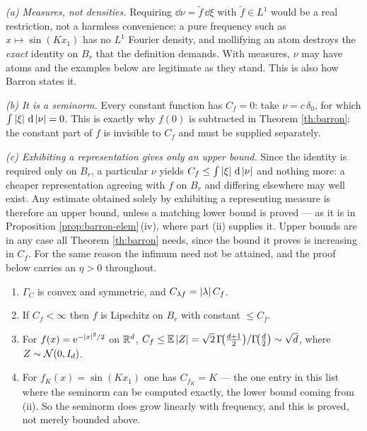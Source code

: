 \documentclass[11pt,a4paper]{article}
\begin{document}
\begin{remark}\label{rem:barron-hygiene}
\emph{(a) Measures, not densities.} Requiring $\dd\nu = \tilde f\,\dd\xi$ with
$\tilde f \in L^1$ would be a real restriction, not a harmless convenience: a pure frequency such
as $x \mapsto \sin(K x_1)$ has no $L^1$ Fourier density, and mollifying an atom destroys the
\emph{exact} identity on $B_r$ that the definition demands. With measures, $\nu$ may have atoms and
the examples below are legitimate as they stand. This is also how Barron states it.

\emph{(b) It is a seminorm.} Every constant function has $C_f = 0$: take $\nu = c\,\delta_0$, for
which $\int\left\lvert \xi \right\rvert\,\mathrm{d}\left\lvert \nu \right\rvert = 0$. This is exactly why $f(0)$ is subtracted in
Theorem \ref{th:barron}: the constant part of $f$ is invisible to $C_f$ and must be supplied
separately.

\emph{(c) Exhibiting a representation gives only an upper bound.} Since the identity is required
only on $B_r$, a particular $\nu$ yields $C_f \le \int\left\lvert \xi \right\rvert\,\mathrm{d}\left\lvert \nu \right\rvert$ and nothing more: a
cheaper representation agreeing with $f$ on $B_r$ and differing elsewhere may well exist. Any
estimate obtained solely by exhibiting a representing measure is therefore an upper bound, unless a
matching lower bound is proved --- as it is in Proposition \ref{prop:barron-elem}\,(iv), where
part (ii) supplies it. Upper bounds are in any case all Theorem \ref{th:barron} needs, since the
bound it proves is increasing in $C_f$. For the same reason the infimum need not be attained, and
the proof below carries an $\eta > 0$ throughout.
\end{remark}

\begin{proposition}\label{prop:barron-elem}
\begin{enumerate}[label=(\roman*)]
\item $\Gamma_C$ is convex and symmetric, and $C_{\lambda f} = \left\lvert \lambda \right\rvert C_f$.
\item If $C_f < \infty$ then $f$ is Lipschitz on $B_r$ with constant $\le C_f$.
\item For $f(x) = \mathrm{e}^{-\left\lvert x \right\rvert^2/2}$ on $\mathbb{R}^d$,
$C_f \le \mathbb{E}\left\lvert Z \right\rvert = \sqrt2\,\Gamma\!\big(\tfrac{d+1}{2}\big)/\Gamma\!\big(\tfrac d2\big) \sim \sqrt d$,
where $Z \sim \mathcal{N}(0,I_d)$.
\item For $f_K(x) = \sin(K x_1)$ one has $C_{f_K} = K$ --- the one entry in this list where the
seminorm can be computed exactly, the lower bound coming from (ii). So the seminorm does grow
linearly with frequency, and this is proved, not merely bounded above.
\end{enumerate}
\end{proposition}
\end{document}
